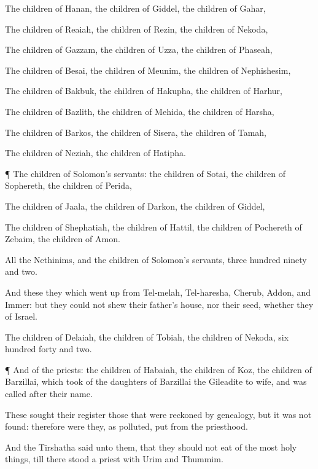 {The
children of
Hanan, the
children of
Giddel, the
children of
Gahar,

The
children of
Reaiah, the
children of
Rezin, the
children of
Nekoda,

The
children of
Gazzam, the
children of
Uzza, the
children of
Phaseah,

The
children of
Besai, the
children of
Meunim, the
children of
Nephishesim,

The
children of
Bakbuk, the
children of
Hakupha, the
children of
Harhur,

The
children of
Bazlith, the
children of
Mehida, the
children of
Harsha,

The
children of
Barkos, the
children of
Sisera, the
children of
Tamah,

The
children of
Neziah, the
children of
Hatipha.


\par }{\PP {}¶ The
children of
Solomon’s
servants: the
children of
Sotai, the
children of
Sophereth, the
children of
Perida,

The
children of
Jaala, the
children of
Darkon, the
children of
Giddel,

The
children of
Shephatiah, the
children of
Hattil, the
children of Pochereth of
Zebaim, the
children of
Amon.

All the
Nethinims, and the
children of
Solomon’s
servants,
{}
three
hundred
ninety and
two.

And these
{} they which went
up
{} from
Tel-melah,
Tel-haresha,
Cherub,
Addon, and
Immer: but they
could not
shew their
father’s
house, nor their
seed, whether they
{} of
Israel.

The
children of
Delaiah, the
children of
Tobiah, the
children of
Nekoda,
six
hundred
forty and
two.


\par }{\PP {}¶ And of the
priests: the
children of
Habaiah, the
children of
Koz, the
children of
Barzillai, which
took
{} of the
daughters of
Barzillai the
Gileadite to
wife, and was
called after their
name.

These
sought their
register
{} those that were reckoned by
genealogy, but it was not
found: therefore were they, as
polluted, put from the
priesthood.

And the
Tirshatha
said unto them, that they should not
eat of the
most holy
things, till there
stood
{} a
priest with
Urim and
Thummim.


}
